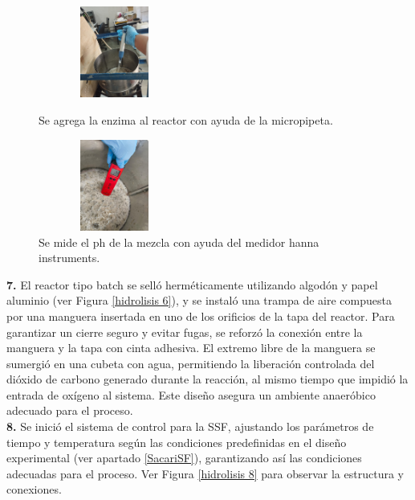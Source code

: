 \documentclass[12pt]{article}
\begin{document}
	     \begin{figure}[H]
	     	\centering
	     	\begin{minipage}{0.46\textwidth}
	     		\centering
	     		\includegraphics[width=5cm, height=3cm]{imagenes/hidrolisis9} %
	     		\caption{ Se agrega la enzima al reactor con ayuda de la micropipeta. }
	     		\label{hidrolisis9}
	     	\end{minipage}
	     	\hfill
	     	\begin{minipage}{0.48\textwidth}
	     		\centering
	     		\includegraphics[width=5cm, height=3cm]{imagenes/hidrolisis3 } %
	     		\caption{ Se mide el ph de la mezcla con ayuda del medidor hanna instruments.}
	     		\label{hidrolisis3}
	     	\end{minipage}
	     \end{figure}
	     
	      \textbf{7.} El reactor tipo batch se selló herméticamente utilizando algodón y papel aluminio (ver Figura \ref{hidrolisis 6}), y se instaló una trampa de aire compuesta por una manguera insertada en uno de los orificios de la tapa del reactor. Para garantizar un cierre seguro y evitar fugas, se reforzó la conexión entre la manguera y la tapa con cinta adhesiva. El extremo libre de la manguera se sumergió en una cubeta con agua, permitiendo la liberación controlada del dióxido de carbono generado durante la reacción, al mismo tiempo que impidió la entrada de oxígeno al sistema. Este diseño asegura un ambiente anaeróbico adecuado para el proceso.
	      \\[0.5em]
	     
	     	\textbf{8.} Se inició el sistema de control para la SSF, ajustando los parámetros de tiempo y temperatura según las condiciones predefinidas en el diseño experimental (ver apartado \ref{SacariSF}), garantizando así las condiciones adecuadas para el proceso. Ver Figura \ref{hidrolisis 8} para observar la estructura y conexiones.
	     	
\end{document}
